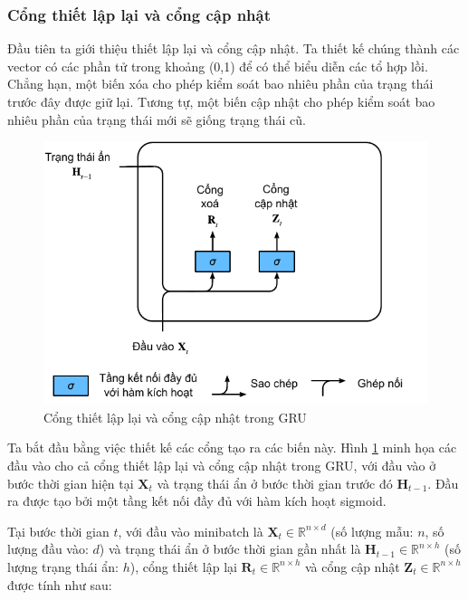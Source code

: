 \documentclass[conference]{IEEEtran}
\begin{document}
\subsubsection{Cổng thiết lập lại và cổng cập nhật}
Đầu tiên ta giới thiệu thiết lập lại và cổng cập nhật. Ta thiết kế chúng thành các vector có các phần tử trong khoảng  (0,1)
để có thể biểu diễn các tổ hợp lồi. Chẳng hạn, một biến xóa cho phép kiểm soát bao nhiêu phần của trạng thái trước đây được giữ lại. Tương tự, một biến cập nhật cho phép kiểm soát bao nhiêu phần của trạng thái mới sẽ giống trạng thái cũ.


\begin{figure}[H]
    \centering
    \begin{minipage}{0.23\textwidth}
        \centering
        \includegraphics[width=1\textwidth]{bibliography/figure/GRU/gru_1.pdf}
        \caption{Cổng thiết lập lại và cổng cập nhật trong GRU}
        \label{fig:gru_del_up}
    \end{minipage}
\end{figure}

Ta bắt đầu bằng việc thiết kế các cổng tạo ra các biến này. Hình \ref{fig:gru_del_up}
minh họa các đầu vào cho cả cổng thiết lập lại và cổng cập nhật trong GRU, với đầu vào ở bước thời gian hiện tại  \(\mathbf{X}_t \)
và trạng thái ẩn ở bước thời gian trước đó  \(\mathbf{H}_{t-1} \). Đầu ra được tạo bởi một tầng kết nối đầy đủ với hàm kích hoạt sigmoid.

Tại bước thời gian $t$, với đầu vào minibatch là $\mathbf{X}_t \in \mathbb{R}^{n \times d}$ (số lượng mẫu: $n$, số lượng đầu vào: $d$) và trạng thái ẩn ở bước thời gian gần nhất là $\mathbf{H}_{t-1} \in \mathbb{R}^{n \times h}$ (số lượng trạng thái ẩn: $h$), cổng thiết lập lại $\mathbf{R}_t \in \mathbb{R}^{n \times h}$ và cổng cập nhật $\mathbf{Z}_t \in \mathbb{R}^{n \times h}$ được tính như sau:
\end{document}
